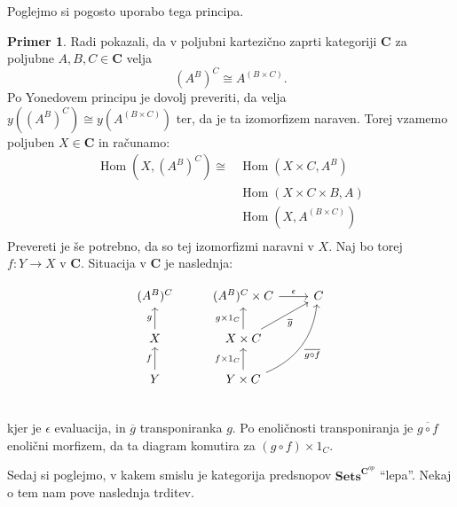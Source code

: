 \documentclass[12pt,a4paper]{book}
\theoremstyle{definition}
\theoremstyle{plain}
\theoremstyle{definition}
\newtheorem{primer}{Primer}[section]
\theoremstyle{remark}
\newcommand{\cat}[1]{\textbf{#1}}
\DeclareMathOperator{\Hom}{Hom}
\newcommand{\predsnop}[1]{\cat{Sets}^{\cat{#1}^{op}}}
\begin{document}
Poglejmo si pogosto uporabo tega principa.

\begin{primer}
Radi pokazali, da v poljubni kartezično zaprti kategoriji $\cat{C}$ za poljubne $A,B,C \in \cat{C}$ velja 
$$(A^B)^C \cong A^{(B \times C)}.$$
Po Yonedovem principu je dovolj preveriti, da velja $y((A^B)^C) \cong y(A^{(B \times C)})$ ter, da je ta izomorfizem naraven. Torej vzamemo poljuben $X \in \cat{C}$ in računamo:
\begin{align*}
\Hom(X, (A^B)^C) \cong &\Hom(X \times C, A^B) \\
&\Hom(X \times C \times B, A) \\
&\Hom(X, A^{(B \times C)}) \\
\end{align*}
Prevereti je še potrebno, da so tej izomorfizmi naravni v $X$.
Naj bo torej $f : Y \to X$ v $ \cat{C}$. Situacija v $\cat{C}$ je naslednja:

\begin{equation}
\begin{tikzcd}
(A^B)^C & (A^B)^C \times C \ar[r, "\epsilon"] & C \\
X \ar[u, "g"] & X \times C \ar[u, "g \times 1_C"] \ar[ur, "\overline{g}"'] & \\
Y \ar[u, "f"] & Y \times C \ar[u, "f \times 1_C"] \ar[uur, bend right, "\overline{g \circ f}"'] & \\
\end{tikzcd}
\end{equation}
kjer je $\epsilon$ evaluacija, in $\overline{g}$ transponiranka $g$. Po enoličnosti transponiranja je $\overline{g \circ f}$ enolični morfizem, da ta diagram komutira za $(g \circ f) \times 1_C$.


\end{primer}


Sedaj si poglejmo, v kakem smislu je kategorija predsnopov $\predsnop{C}$ "`lepa"'. Nekaj o tem nam pove naslednja trditev.
\end{document}

